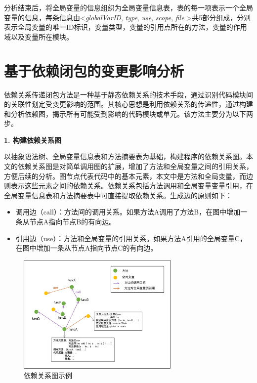 分析结束后，将全局变量的信息组织为全局变量信息表，表的每一项表示一个全局变量的信息，每条信息由\textless \textit{globalVarID}, \textit{type}, \textit{use}, \textit{scope}, \textit{file}  \textgreater 共5部分组成，分别表示全局变量的唯一ID标识，变量类型，变量的引用点所在的方法，变量的作用域以及变量所在模块。



\section{基于依赖闭包的变更影响分析}

依赖关系传递闭包方法是一种基于静态依赖关系的技术手段，通过识别代码模块间的关联性划定受变更影响的范围\cite{2022An}。其核心思想是利用依赖关系的传递性，通过构建和分析依赖图，揭示所有可能受到影响的代码模块或单元\cite{2021Improving}。该方法主要分为以下两步。

\noindent \textbf{1. 构建依赖关系图}
\label{1_代码依赖图}



以抽象语法树、全局变量信息表和方法摘要表为基础，构建程序的依赖关系图。本文的依赖关系图是对简单调用图的扩展，增加了方法和全局变量之间的引用关系，方便后续的分析。图节点代表代码中的基本元素，本文中是方法和全局变量，而边则表示这些元素之间的依赖关系。依赖关系包括方法调用和全局变量变量引用，在全局变量信息表和方法摘要表中可直接提取依赖关系。生成边的原则如下：
\begin{itemize}
    \item 调用边（call）：方法间的调用关系。如果方法A调用了方法B，在图中增加一条从节点A指向节点B的有向边。
    
    \item 引用边（use）：方法和全局变量的引用关系。如果方法A引用的全局变量C，在图中增加一条从节点A指向节点C的有向边。
\end{itemize}


\begin{figure}[htbp]
    \centering
    \includegraphics[width = 0.7\textwidth]{figures/依赖关系图.png}
    \caption{依赖关系图示例}
    \label{1_依赖图示例}
    \end{figure}



